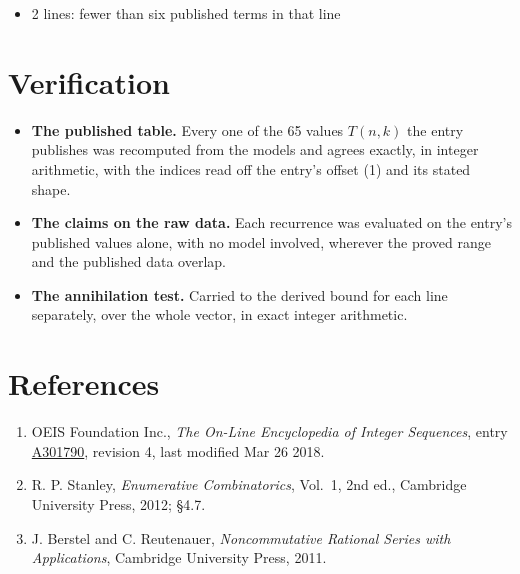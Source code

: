 \documentclass[11pt]{article}
\theoremstyle{definition}
\begin{document}
\begin{itemize}

\item 2 lines: fewer than six published terms in that line

\end{itemize}

\section{Verification}

\begin{itemize}

\item {\bfseries The published table.} Every one of the 65 values $T(n,k)$ the entry publishes was recomputed from the models and agrees exactly, in integer arithmetic, with the indices read off the entry's offset (1) and its stated shape.

\item {\bfseries The claims on the raw data.} Each recurrence was evaluated on the entry's published values alone, with no model involved, wherever the proved range and the published data overlap.

\item {\bfseries The annihilation test.} Carried to the derived bound for each line separately, over the whole vector, in exact integer arithmetic.

\end{itemize}

\section{References}

\begin{enumerate}

\item OEIS Foundation Inc., \emph{The On-Line Encyclopedia of Integer Sequences}, entry \href{https://oeis.org/A301790}{A301790}, revision 4, last modified Mar 26 2018.

\item R. P. Stanley, \emph{Enumerative Combinatorics}, Vol.~1, 2nd ed., Cambridge University Press, 2012; \S4.7.

\item J. Berstel and C. Reutenauer, \emph{Noncommutative Rational Series with Applications}, Cambridge University Press, 2011.

\end{enumerate}
\end{document}
